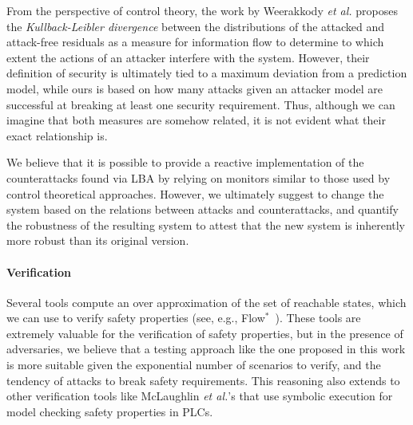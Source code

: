 {{From the perspective of control theory, the work by Weerakkody \emph{et al.} \cite{IFCPSSec} proposes the \emph{Kullback-Leibler divergence} between the distributions of the attacked and attack-free residuals as {a measure for information flow} to determine to which extent the actions of an attacker interfere with the system. However, their definition of security is ultimately tied to a maximum deviation from a prediction model, while ours is based on how many attacks given an attacker model are successful at breaking at least one security requirement. Thus, although we can imagine that both measures are somehow related, it is not evident what their exact relationship is.

We believe that it is possible to provide a reactive implementation of the counterattacks found via LBA by relying on monitors similar to those used by control theoretical approaches. However, we ultimately suggest to change the system based on the relations between attacks and counterattacks, and quantify the robustness of the resulting system to attest that the new system is inherently more robust than its original version.
 

\paragraph{Verification}
Several tools compute an over approximation of the set of reachable states, which we can use to verify safety properties (see, e.g., Flow$^*$~\cite{FlowStar}). 
These tools are extremely valuable for the verification of safety properties, but in the presence of adversaries, we believe that a testing approach like the one proposed in this work is more suitable given the exponential number of scenarios to verify, and the tendency of attacks to break safety requirements. This reasoning also extends to other verification tools like McLaughlin \emph{et al.}'s \cite{TSVPLC} that use symbolic execution for model checking safety properties in PLCs.

{
}

}}
